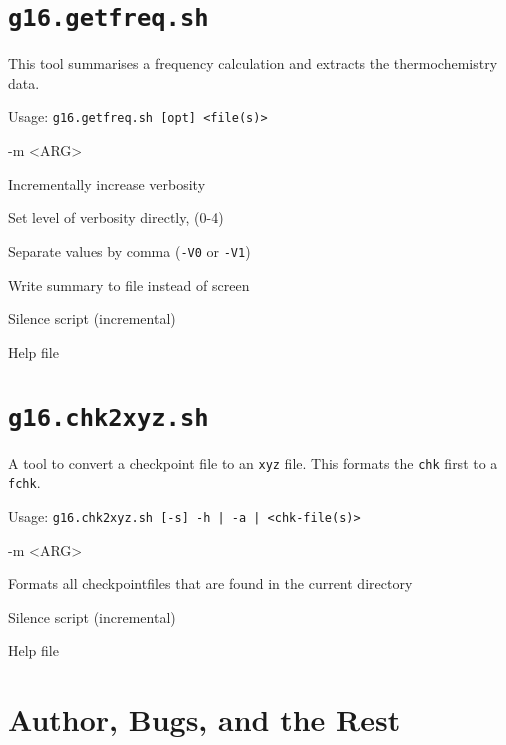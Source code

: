 \documentclass[   %
  final,          %
  a4paper,        %
  rscols=3,       %
  margin=1.0cm,   %
]{refsheet}
\begin{document}
\section{\texttt{g16.getfreq.sh}}

This tool summarises a frequency calculation and extracts the thermochemistry data.

Usage: \texttt{g16.getfreq.sh [opt] <file(s)>}

\begin{rslisttt}{-m <ARG>}
  \item[-v      ] Incrementally increase verbosity
  \item[-V <INT>] Set level of verbosity directly, (0-4)
  \item[-c      ] Separate values by comma (\texttt{-V0} or \texttt{-V1})
  \item[-f <ARG>] Write summary to file instead of screen
  \item[-s      ] Silence script (incremental)
  \item[-h      ] Help file 
\end{rslisttt}

\section{\texttt{g16.chk2xyz.sh}}

A tool to convert a checkpoint file to an \texttt{xyz} file. 
This formats the \texttt{chk} first to a \texttt{fchk}.

Usage: \texttt{g16.chk2xyz.sh [-s] -h | -a | <chk-file(s)>}

\begin{rslisttt}{-m <ARG>}
  \item[-a      ] Formats all checkpointfiles that are found in the current directory
  \item[-s      ] Silence script (incremental)
  \item[-h      ] Help file 
\end{rslisttt}

\vfill
\section{Author, Bugs, and the Rest}

\end{document}
